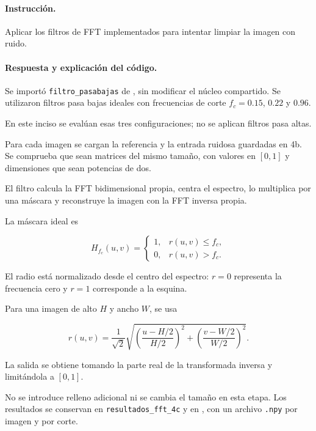 \documentclass[11pt]{article}
\begin{document}
\paragraph{Instrucción.}

Aplicar los filtros de FFT implementados para intentar
limpiar la imagen con ruido.

\paragraph{Respuesta y explicación del código.}

Se importó \texttt{filtro\_pasabajas} de
, sin modificar el núcleo
compartido. Se utilizaron filtros pasa bajas ideales con
frecuencias de corte $f_c=0.15$, $0.22$ y $0.96$.

En este inciso se evalúan esas tres configuraciones;
no se aplican filtros pasa altas.

Para cada imagen se cargan la referencia y la entrada
ruidosa guardadas en 4b. Se comprueba que sean matrices
del mismo tamaño, con valores en $[0,1]$ y dimensiones
que sean potencias de dos.

El filtro calcula la FFT bidimensional propia, centra
el espectro, lo multiplica por una máscara y reconstruye
la imagen con la FFT inversa propia.

La máscara ideal es

\begin{equation}
 H_{f_c}(u,v)
 =
 \begin{cases}
 1, & r(u,v)\leq f_c,\\
 0, & r(u,v)>f_c.
 \end{cases}
\end{equation}

El radio está normalizado desde el centro del espectro:
$r=0$ representa la frecuencia cero y $r=1$ corresponde
a la esquina.

Para una imagen de alto $H$ y ancho $W$, se usa

\begin{equation}
 r(u,v)
 =
 \frac{1}{\sqrt{2}}
 \sqrt{
    \left(\frac{u-H/2}{H/2}\right)^2
    +
    \left(\frac{v-W/2}{W/2}\right)^2
 }.
\end{equation}

La salida se obtiene tomando la parte real de la
transformada inversa y limitándola a $[0,1]$.

No se introduce relleno adicional ni se cambia el tamaño
en esta etapa. Los resultados se conservan en
\texttt{resultados\_fft\_4c} y en
, con un archivo \texttt{.npy}
por imagen y por corte.
\end{document}
